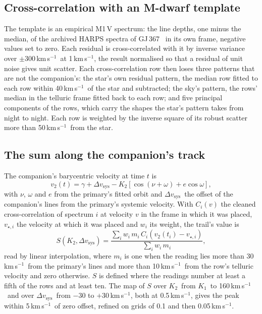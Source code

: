 \documentclass[3p,11pt]{elsarticle}
\newcommand{\kms}{km\,s$^{-1}$}
\newcommand{\Kone}{$K_1$}
\newcommand{\Ktwo}{$K_2$}
\newcommand{\dvsys}{$\Delta v_\mathrm{sys}$}
\begin{document}
\subsection{Cross-correlation with an M-dwarf template}

The template is an empirical M1\,V spectrum: the line depths, one minus the median, of the archived
HARPS spectra of GJ\,367~\cite{Lam2021} in its own frame, negative values set to zero. Each
residual is cross-correlated with it by inverse variance over $\pm 300$\,\kms\ at 1\,\kms, the
result normalised so that a residual of unit noise gives unit scatter. Each cross-correlation row
then loses three patterns that are not the companion's: the star's own residual pattern, the
median row fitted to each row within 40\,\kms\ of the star and subtracted; the sky's pattern, the
rows' median in the telluric frame fitted back to each row; and five principal components of the
rows, which carry the shapes the star's pattern takes from night to night. Each row is weighted by
the inverse square of its robust scatter more than 50\,\kms\ from the star.

\subsection{The sum along the companion's track}

The companion's barycentric velocity at time $t$ is
\begin{equation}
v_2(t) = \gamma + \Delta v_\mathrm{sys} - K_2\left[\cos(\nu + \omega) + e\cos\omega\right],
\end{equation}
with $\nu$, $\omega$ and $e$ from the primary's fitted orbit and \dvsys\ the offset of the
companion's lines from the primary's systemic velocity. With $C_i(v)$ the cleaned
cross-correlation of spectrum $i$ at velocity $v$ in the frame in which it was placed,
$v_{\star,i}$ the velocity at which it was placed and $w_i$ its weight, the trail's value is
\begin{equation}
S(K_2, \Delta v_\mathrm{sys}) = \frac{\sum_i w_i\, m_i\, C_i\!\left(v_2(t_i) - v_{\star,i}\right)}{\sum_i w_i\, m_i},
\end{equation}
read by linear interpolation, where $m_i$ is one when the reading lies more than 30\,\kms\ from the
primary's lines and more than 10\,\kms\ from the row's telluric velocity and zero otherwise. $S$ is
defined where the readings number at least a fifth of the rows and at least ten. The map of $S$
over \Ktwo\ from \Kone\ to 160\,\kms\ and over \dvsys\ from $-30$ to $+30$\,\kms, both at
0.5\,\kms, gives the peak within 5\,\kms\ of zero offset, refined on grids of 0.1 and then
0.05\,\kms.
\end{document}
